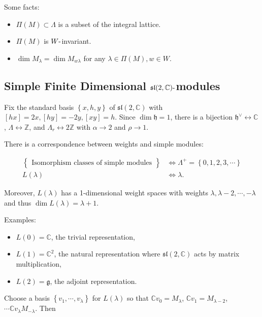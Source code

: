 \documentclass[11pt]{scrartcl}
\theoremstyle{definition}
\theoremstyle{theorem}
\theoremstyle{proof}
\theoremstyle{definition}
\theoremstyle{break}
\theoremstyle{problem}
\providecommand{\tightlist}{%
  \setlength{\itemsep}{0pt}\setlength{\parskip}{0pt}}
\newcommand{\CC}[0]{{\mathbb{C}}}
\newcommand{\ZZ}[0]{{\mathbb{Z}}}
\newcommand{\correspond}[1]{\theset{\substack{#1}}}
\newcommand{\dash}[0]{{\hbox{-}}}
\newcommand{\dual}[0]{^\vee}
\newcommand{\lieg}[0]{{\mathfrak{g}}}
\newcommand{\lieh}[0]{{\mathfrak{h}}}
\newcommand{\liesl}[0]{{\mathfrak{sl}}}
\newcommand{\theset}[1]{\left\{{#1}\right\}}
\renewcommand{\to}[0]{\longrightarrow}
\begin{document}
Some facts:

\begin{itemize}
\tightlist
\item
  \(\Pi(M) \subset \Lambda\) is a subset of the integral lattice.
\item
  \(\Pi(M)\) is \(W\dash\)invariant.
\item
  \(\dim M_\lambda = \dim M_{w\lambda}\) for any
  \(\lambda \in \Pi(M), w\in W\).
\end{itemize}

\hypertarget{simple-finite-dimensional-liesl2-ccdashmodules}{%
\subsection{\texorpdfstring{Simple Finite Dimensional
\(\liesl(2, \CC)\dash\)modules}{Simple Finite Dimensional \textbackslash liesl(2, \textbackslash CC)\textbackslash dashmodules}}\label{simple-finite-dimensional-liesl2-ccdashmodules}}

Fix the standard basis \(\theset{x, h, y}\) of \(\liesl(2, \CC)\) with
\([h x] = 2x, [h y] = -2y, [x y] = h\). Since \(\dim \lieh = 1\), there
is a bijection \(\lieh\dual \leftrightarrow \CC\),
\(\Lambda \leftrightarrow \ZZ\), and \(\Lambda_r \leftrightarrow 2\ZZ\)
with \(\alpha \to 2\) and \(\rho \to 1\).

There is a correspondence between weights and simple modules:

\begin{align*}
\correspond{\text{Isomorphism classes of simple modules}} &\iff \Lambda^+ = \theset{0,1,2,3,\cdots} \\
L(\lambda) &\iff \lambda
.\end{align*}

Moreover, \(L(\lambda)\) has a 1-dimensional weight spaces with weights
\(\lambda, \lambda - 2, \cdots, -\lambda\) and thus
\(\dim L(\lambda) = \lambda + 1\).

Examples:

\begin{itemize}
\tightlist
\item
  \(L(0) = \CC\), the trivial representation,
\item
  \(L(1) = \CC^2\), the natural representation where \(\liesl(2, \CC)\)
  acts by matrix multiplication,
\item
  \(L(2) = \lieg\), the adjoint representation.
\end{itemize}

Choose a basis \(\theset{v_1, \cdots, v_\lambda}\) for \(L(\lambda)\) so
that \(\CC v_0 = M_{\lambda}\), \(\CC v_1 = M_{\lambda - 2}\),
\(\cdots \CC v_{\lambda} M_{-\lambda}\). Then
\end{document}
